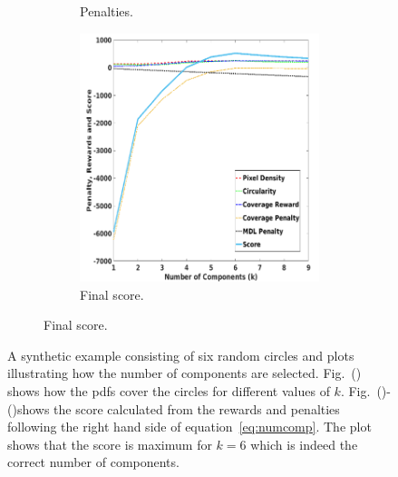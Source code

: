 \begin{figure}[!hbpt]
\begin{subfigure}{\textwidth}
\begin{subfigure}{.32\textwidth}
            \caption{Penalties.}
        \label{fig:gmmkplotpen}    
       \end{subfigure} \begin{subfigure}{.32\textwidth}   
       \centering
       \includegraphics[width = \textwidth]{figures/counting/iserscorepart33.png} 
            \caption{Final score.}
        \label{fig:gmmkplot}   
       \end{subfigure}
       \end{subfigure}
  \caption[Fruit counting on synthetic data using unsupervised clustering.]{A synthetic example consisting of six random circles and plots illustrating how the number of components are selected. Fig.~() shows how the pdfs cover the circles for different values of $k$. Fig.~()-()shows the score calculated from the rewards and penalties following the right hand side of equation~\eqref{eq:numcomp}. The plot shows that the score is maximum for $k = 6$ which is indeed the correct number of components.}
   \label{fig:grpsyn}
\end{figure}    

